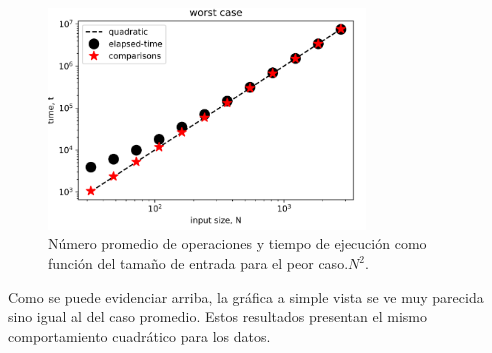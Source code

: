 \begin{figure}[H]
	\centering
	\includegraphics[keepaspectratio, width = 0.75\textwidth]{worstc.png}
	\caption{
		Número promedio de operaciones y tiempo de ejecución como función del tamaño de entrada para el peor caso.$N^2$.
	}
	\label{fig:best}
\end{figure}

Como se puede evidenciar arriba, la gráfica a simple vista se ve muy parecida sino igual al del caso promedio. Estos resultados presentan el mismo comportamiento cuadrático para los datos. 

